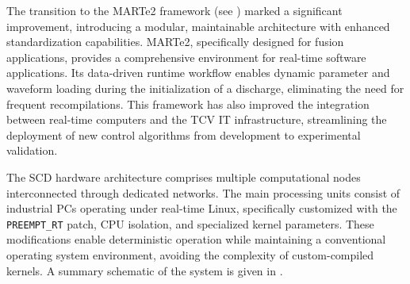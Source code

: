 The transition to the MARTe2 framework (see ) marked a significant improvement, introducing a modular, maintainable architecture with enhanced standardization capabilities. MARTe2, specifically designed for fusion applications, provides a comprehensive environment for real-time software applications. Its data-driven runtime workflow enables dynamic parameter and waveform loading during the initialization of a discharge, eliminating the need for frequent recompilations. This framework has also improved the integration between real-time computers and the TCV IT infrastructure, streamlining the deployment of new control algorithms from development to experimental validation.

The SCD hardware architecture comprises multiple computational nodes interconnected through dedicated networks. The main processing units consist of industrial PCs operating under real-time Linux, specifically customized with the \texttt{PREEMPT\_RT} patch, CPU isolation, and specialized kernel parameters. These modifications enable deterministic operation while maintaining a conventional operating system environment, avoiding the complexity of custom-compiled kernels. A summary schematic of the system is given in .

